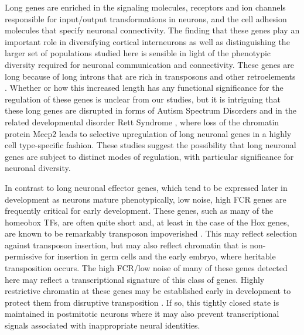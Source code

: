 Long genes are enriched in the signaling molecules, receptors and ion channels responsible for input/output transformations in neurons, and the cell adhesion molecules that specify neuronal connectivity. The finding that these genes play an important role in diversifying cortical interneurons \cite{Paul_2017} as well as distinguishing the larger set of populations studied here is sensible in light of the phenotypic diversity required for neuronal communication and connectivity. These genes are long because of long introns that are rich in transposons and other retroelements \citep{Grishkevich_2014}. Whether or how this increased length has any functional significance for the regulation of these genes is unclear from our studies, but it is intriguing that these long genes are disrupted in forms of Autism Spectrum Disorders \citep{Zylka_2015,Wei_2016} and in the related developmental disorder Rett Syndrome \citep{Sugino_2014,Gabel_2015}, where loss of the chromatin protein Mecp2 leads to selective upregulation of long neuronal genes in a highly cell type-specific fashion. These studies suggest the possibility that long neuronal genes are subject to distinct modes of regulation, with particular significance for neuronal diversity.   

In contrast to long neuronal effector genes, which tend to be expressed later in development as neurons mature phenotypically, low noise, high FCR genes are frequently critical for early development. These genes, such as many of the homeobox TFs, are often quite short and, at least in the case of the Hox genes, are known to be remarkably transposon impoverished \citep{Chinwalla_2002,Simons_2005}. This may reflect selection against transposon insertion, but may also reflect chromatin that is non-permissive for insertion in germ cells and the early embryo, where heritable transposition occurs. The high FCR/low noise of many of these genes detected here may reflect a transcriptional signature of this class of genes. Highly restrictive chromatin at these genes may be established early in development to protect them from disruptive transposition \citep{Montavon_2014}. If so, this tightly closed state is maintained in postmitotic neurons where it may also prevent transcriptional signals associated with inappropriate neural identities. 


